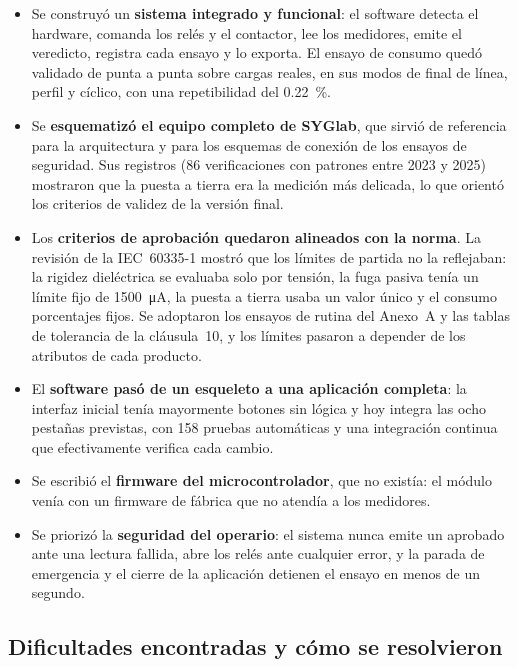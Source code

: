 \begin{itemize}
    \item Se construyó un \textbf{sistema integrado y funcional}: el software
          detecta el hardware, comanda los relés y el contactor, lee los
          medidores, emite el veredicto, registra cada ensayo y lo exporta. El
          ensayo de consumo quedó validado de punta a punta sobre cargas reales,
          en sus modos de final de línea, perfil y cíclico, con una repetibilidad
          del \SI{0,22}{\percent}.
    \item Se \textbf{esquematizó el equipo completo de SYGlab}, que sirvió de
          referencia para la arquitectura y para los esquemas de conexión de los
          ensayos de seguridad. Sus registros (86 verificaciones con patrones
          entre 2023 y 2025) mostraron que la puesta a tierra era la medición más
          delicada, lo que orientó los criterios de validez de la versión final.
    \item Los \textbf{criterios de aprobación quedaron alineados con la norma}.
          La revisión de la IEC~60335-1 mostró que los límites de partida no la
          reflejaban: la rigidez dieléctrica se evaluaba solo por tensión, la fuga
          pasiva tenía un límite fijo de \SI{1500}{\micro\ampere}, la puesta a
          tierra usaba un valor único y el consumo porcentajes fijos. Se
          adoptaron los ensayos de rutina del Anexo~A y las tablas de tolerancia
          de la cláusula~10, y los límites pasaron a depender de los atributos de
          cada producto.
    \item El \textbf{software pasó de un esqueleto a una aplicación completa}: la
          interfaz inicial tenía mayormente botones sin lógica y hoy integra las
          ocho pestañas previstas, con 158 pruebas automáticas y una integración
          continua que efectivamente verifica cada cambio.
    \item Se escribió el \textbf{firmware del microcontrolador}, que no existía:
          el módulo venía con un firmware de fábrica que no atendía a los
          medidores.
    \item Se priorizó la \textbf{seguridad del operario}: el sistema nunca emite
          un aprobado ante una lectura fallida, abre los relés ante cualquier
          error, y la parada de emergencia y el cierre de la aplicación detienen el
          ensayo en menos de un segundo.
\end{itemize}

\subsection{Dificultades encontradas y cómo se resolvieron}
\label{subsec:dificultades}


